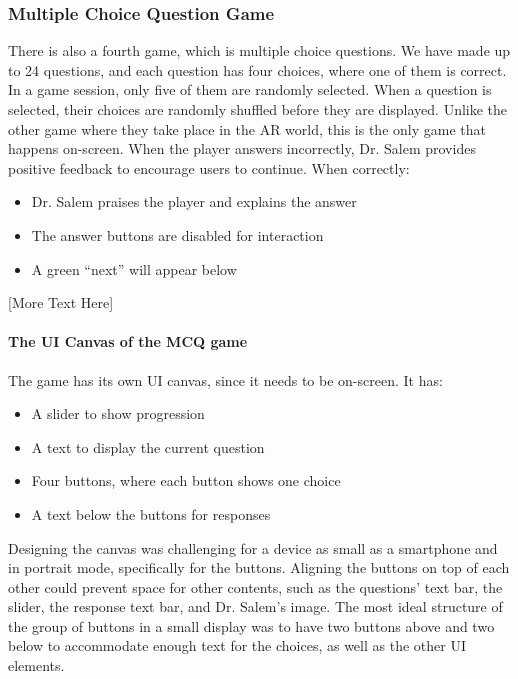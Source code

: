 \subsubsection*{Multiple Choice Question Game}
There is also a fourth game, which is multiple choice questions. We have made up to 24 questions, and each question has four choices, where one of them is correct. In a game session, only five of them are randomly selected. When a question is selected, their choices are randomly shuffled before they are displayed. Unlike the other game where they take place in the AR world, this is the only game that happens on-screen. When the player answers incorrectly, Dr. Salem provides positive feedback to encourage users to continue. When correctly:
\begin{itemize}
\item{Dr. Salem praises the player and explains the answer}

\item{The answer buttons are disabled for interaction}

\item{A green “next” will appear below}
\end{itemize}

[More Text Here]
\paragraph*{The UI Canvas of the MCQ game}
The game has its own UI canvas, since it needs to be on-screen. It has:
\begin{itemize}
\item{A slider to show progression}

\item{A text to display the current question}

\item{Four buttons, where each button shows one choice}

\item{A text below the buttons for responses}
\end{itemize}
Designing the canvas was challenging for a device as small as a smartphone and in portrait mode, specifically for the buttons. Aligning the buttons on top of each other could prevent space for other contents, such as the questions’ text bar, the slider, the response text bar, and Dr. Salem’s image. The most ideal structure of the group of buttons in a small display was to have two buttons above and two below to accommodate enough text for the choices, as well as the other UI elements.

